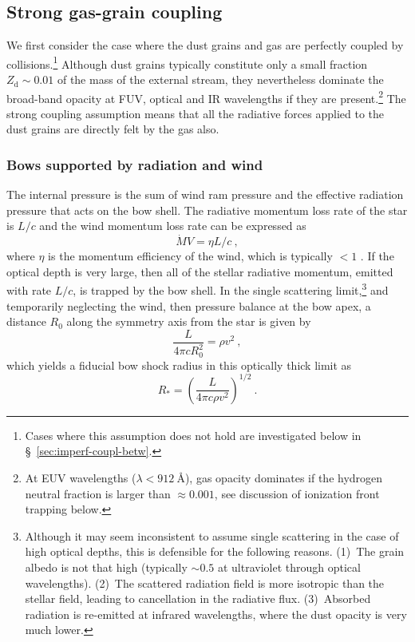 \message{ !name(dusty-bow-wave.tex)}\documentclass[useAMS, usenatbib, a4paper]{mnras}
\newcommand{\grain}{\ensuremath{_{\text{d}}}}
\begin{document}
\subsection{Strong gas-grain coupling}
\label{sec:strong-gas-grain}

We first consider the case where the dust grains and gas are perfectly
coupled by collisions.\footnote{%
  Cases where this assumption does not hold are investigated below in
  \S~\ref{sec:imperf-coupl-betw}.} %
Although dust grains typically constitute only a small fraction
\(Z\grain \sim 0.01\) of the mass of the external stream, they
nevertheless dominate the broad-band opacity at FUV, optical and IR
wavelengths if they are present.\footnote{%
  At EUV wavelengths (\(\lambda < \SI{912}{\angstrom}\)), gas opacity
  dominates if the hydrogen neutral fraction is larger than
  \(\approx 0.001\), see discussion of ionization front trapping
  below.} %
The strong coupling assumption means that all the radiative forces
applied to the dust grains are directly felt by the gas also.

\subsubsection{Bows supported by radiation and wind}
\label{sec:three-bow-regimes}

The internal pressure is the sum of wind ram pressure and the
effective radiation pressure that acts on the bow shell.  The
radiative momentum loss rate of the star is \(L/c\) and the wind
momentum loss rate can be expressed as
\begin{equation}
  \label{eq:wind-efficiency}
  \dot{M} V = \eta L / c \ , 
\end{equation}
where \(\eta\) is the momentum efficiency of the wind, which is typically
\(< 1\) \citep{Lamers:1999b}. If the optical depth is very large, then
all of the stellar radiative momentum, emitted with rate \(L/c\), is
trapped by the bow shell.  In the single scattering limit,\footnote{%
  Although it may seem inconsistent to assume single scattering in the
  case of high optical depths, this is defensible for the following
  reasons. (1)~The grain albedo is not that high (typically
  \(\sim 0.5\) at ultraviolet through optical wavelengths). (2)~The
  scattered radiation field is more isotropic than the stellar field,
  leading to cancellation in the radiative
  flux. (3)~Absorbed radiation is re-emitted at infrared
  wavelengths, where the dust opacity is very much lower.} %
and temporarily neglecting the wind, then pressure balance at the bow
apex, a distance \(R_0\) along the symmetry axis from the star is
given by
\begin{equation}
  \label{eq:rad-press-balance-thick}
  \frac{L}{4 \pi c R_0^2} = \rho v^2 \ ,
\end{equation}
which yields a fiducial bow shock radius in this optically thick limit
as
\begin{equation}
  \label{eq:Rstar}
  R_* = \left(\frac{L}{4\pi c \rho v^2}\right)^{1/2} \ .
\end{equation}
\end{document}
